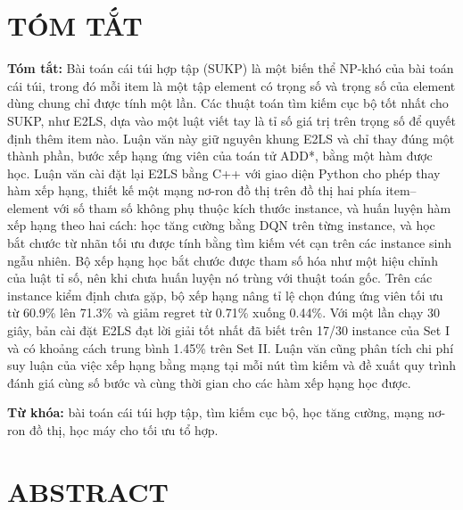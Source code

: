 \section*{\centering TÓM TẮT}

\textbf{Tóm tắt:} Bài toán cái túi hợp tập (SUKP) là một biến thể NP-khó của bài toán cái túi, trong đó mỗi item là một tập element có trọng số và trọng số của element dùng chung chỉ được tính một lần. Các thuật toán tìm kiếm cục bộ tốt nhất cho SUKP, như E2LS, dựa vào một luật viết tay là tỉ số giá trị trên trọng số để quyết định thêm item nào. Luận văn này giữ nguyên khung E2LS và chỉ thay đúng một thành phần, bước xếp hạng ứng viên của toán tử ADD*, bằng một hàm được học. Luận văn cài đặt lại E2LS bằng C++ với giao diện Python cho phép thay hàm xếp hạng, thiết kế một mạng nơ-ron đồ thị trên đồ thị hai phía item--element với số tham số không phụ thuộc kích thước instance, và huấn luyện hàm xếp hạng theo hai cách: học tăng cường bằng DQN trên từng instance, và học bắt chước từ nhãn tối ưu được tính bằng tìm kiếm vét cạn trên các instance sinh ngẫu nhiên. Bộ xếp hạng học bắt chước được tham số hóa như một hiệu chỉnh của luật tỉ số, nên khi chưa huấn luyện nó trùng với thuật toán gốc. Trên các instance kiểm định chưa gặp, bộ xếp hạng nâng tỉ lệ chọn đúng ứng viên tối ưu từ 60.9\% lên 71.3\% và giảm regret từ 0.71\% xuống 0.44\%. Với một lần chạy 30 giây, bản cài đặt E2LS đạt lời giải tốt nhất đã biết trên 17/30 instance của Set I và có khoảng cách trung bình 1.45\% trên Set II. Luận văn cũng phân tích chi phí suy luận của việc xếp hạng bằng mạng tại mỗi nút tìm kiếm và đề xuất quy trình đánh giá cùng số bước và cùng thời gian cho các hàm xếp hạng học được.

\textbf{Từ khóa:} bài toán cái túi hợp tập, tìm kiếm cục bộ, học tăng cường, mạng nơ-ron đồ thị, học máy cho tối ưu tổ hợp.

\vspace{0.8cm}

\section*{\centering ABSTRACT}

